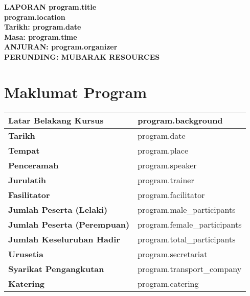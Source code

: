 \documentclass[a4paper,12pt]{article}
\begin{document}
\begin{center}
    \vspace*{1cm}
    \textbf{\huge LAPORAN {{program.title}}}\\
    \vspace{0.5cm}
    \textbf{{program.location}}\\
    \vspace{0.5cm}
    \textbf{Tarikh: {{program.date}}}\\
    \vspace{0.5cm}
    \textbf{Masa: {{program.time}}}\\
    \vspace{1cm}
    \textbf{ANJURAN: {{program.organizer}}}\\
    \vspace{0.5cm}
    \textbf{PERUNDING: MUBARAK RESOURCES}
\end{center}

\tableofcontents
\newpage

\section{Maklumat Program}
\begin{tabular}{|l|l|}
    \hline
    \textbf{Latar Belakang Kursus} & {{program.background}} \\
    \hline
    \textbf{Tarikh} & {{program.date}} \\
    \hline
    \textbf{Tempat} & {{program.place}} \\
    \hline
    \textbf{Penceramah} & {{program.speaker}} \\
    \hline
    \textbf{Jurulatih} & {{program.trainer}} \\
    \hline
    \textbf{Fasilitator} & {{program.facilitator}} \\
    \hline
    \textbf{Jumlah Peserta (Lelaki)} & {{program.male_participants}} \\
    \hline
    \textbf{Jumlah Peserta (Perempuan)} & {{program.female_participants}} \\
    \hline
    \textbf{Jumlah Keseluruhan Hadir} & {{program.total_participants}} \\
    \hline
    \textbf{Urusetia} & {{program.secretariat}} \\
    \hline
    \textbf{Syarikat Pengangkutan} & {{program.transport_company}} \\
    \hline
    \textbf{Katering} & {{program.catering}} \\
    \hline
\end{tabular}
\end{document}
